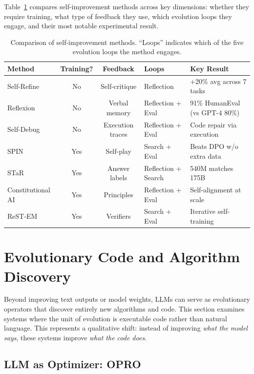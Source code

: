 \documentclass[11pt,a4paper]{article}
\begin{document}
Table~\ref{tab:methods-comparison} compares self-improvement methods across key dimensions: whether they require training, what type of feedback they use, which evolution loops they engage, and their most notable experimental result.

\begin{table}[t]
\centering
\caption{Comparison of self-improvement methods. ``Loops'' indicates which of the five evolution loops the method engages.}
\label{tab:methods-comparison}
\small
\begin{tabular}{@{}p{2cm}ccp{2cm}p{3cm}@{}}
\toprule
\textbf{Method} & \textbf{Training?} & \textbf{Feedback} & \textbf{Loops} & \textbf{Key Result} \\
\midrule
Self-Refine & No & Self-critique & Reflection & +20\% avg across 7 tasks \\
Reflexion & No & Verbal memory & Reflection + Eval & 91\% HumanEval (vs GPT-4 80\%) \\
Self-Debug & No & Execution traces & Reflection + Eval & Code repair via execution \\
SPIN & Yes & Self-play & Search + Eval & Beats DPO w/o extra data \\
STaR & Yes & Answer labels & Reflection + Search & 540M matches 175B \\
Constitutional AI & Yes & Principles & Reflection + Eval & Self-alignment at scale \\
ReST-EM & Yes & Verifiers & Search + Eval & Iterative self-training \\
\bottomrule
\end{tabular}
\end{table}

\section{Evolutionary Code and Algorithm Discovery}
\label{sec:evolutionary-code}

Beyond improving text outputs or model weights, LLMs can serve as evolutionary operators that discover entirely new algorithms and code. This section examines systems where the unit of evolution is executable code rather than natural language. This represents a qualitative shift: instead of improving \emph{what the model says}, these systems improve \emph{what the code does}.

\subsection{LLM as Optimizer: OPRO}
\end{document}
